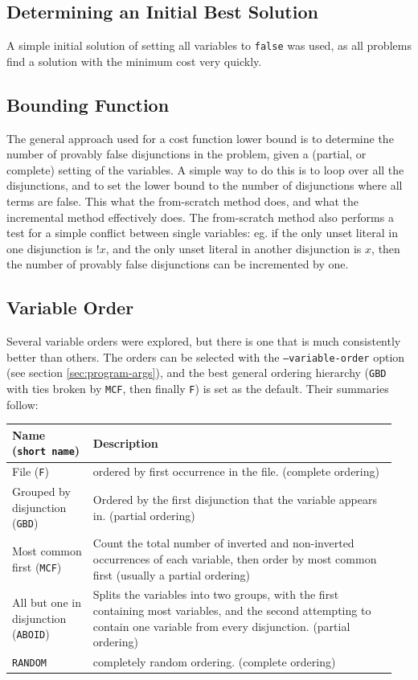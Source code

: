 \documentclass[10pt]{article}
\begin{document}
\subsection{Determining an Initial Best Solution}
A simple initial solution of setting all variables to \texttt{false} was used, as all problems find a solution with the minimum cost very quickly.

\subsection{Bounding Function}\label{sec:single-unset-conflict}
The general approach used for a cost function lower bound is to determine the number of provably false disjunctions in the problem, given a (partial, or complete) setting of the variables. A simple way to do this is to loop over all the disjunctions, and to set the lower bound to the number of disjunctions where all terms are false. This what the from-scratch method does, and what the incremental method effectively does. The from-scratch method also performs a test for a simple conflict between single variables: eg. if the only unset literal in one disjunction is $!x$, and the only unset literal in another disjunction is $x$, then the number of provably false disjunctions can be incremented by one. 

\subsection{Variable Order}
Several variable orders were explored, but there is one that is much consistently better than others. The orders can be selected with the \texttt{--variable-order} option (see section \ref{sec:program-args}), and the best general ordering hierarchy (\texttt{GBD} with ties broken by \texttt{MCF}, then finally \texttt F) is set as the default. Their summaries follow:
\begin{table}[H]
\centering
\begin{tabular}{p{0.2\linewidth} | p{0.75\linewidth}}
\hline\hline
Name (\texttt{short name}) & Description \\
\hline
File (\texttt{F}) & ordered by first occurrence in the file. (complete ordering) \\\hline
Grouped by disjunction (\texttt{GBD}) & Ordered by the first disjunction that the variable appears in. (partial ordering) \\\hline
Most common first (\texttt{MCF}) & Count the total number of inverted and non-inverted occurrences of each variable, then order by most common first (usually a partial ordering) \\\hline
All but one in disjunction (\texttt{ABOID}) & Splits the variables into two groups, with the first containing most variables, and the second attempting to contain one variable from every disjunction. (partial ordering) \\\hline
\texttt{RANDOM} & completely random ordering. (complete ordering) \\
\hline
\end{tabular}
\end{table}
\end{document}
